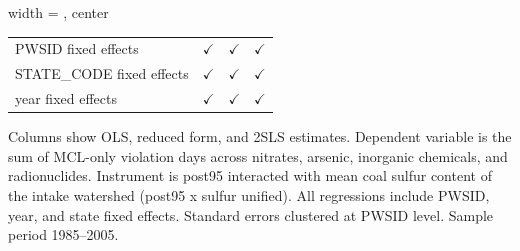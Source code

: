 \begin{table}[htbp]
\begin{adjustbox}{width = \textwidth, center}
\begin{tabular}{lccc}
          \\
         
         PWSID fixed effects                               & $\checkmark$  & $\checkmark$  & $\checkmark$\\   
         STATE\_CODE fixed effects                         & $\checkmark$  & $\checkmark$  & $\checkmark$\\   
         year fixed effects                                & $\checkmark$  & $\checkmark$  & $\checkmark$\\   
         
         \bottomrule
         
      \end{tabular}
      
      
      
   \end{adjustbox}
      {\tiny\linespread{1}\selectfont \par \raggedright 
   Columns show OLS, reduced form, and 2SLS estimates. Dependent variable is the sum of MCL-only violation days across nitrates, arsenic, inorganic chemicals, and radionuclides. Instrument is post95 interacted with mean coal sulfur content of the intake watershed (post95 x sulfur unified). All regressions include PWSID, year, and state fixed effects. Standard errors clustered at PWSID level. Sample period 1985--2005.}
   
\end{table}


